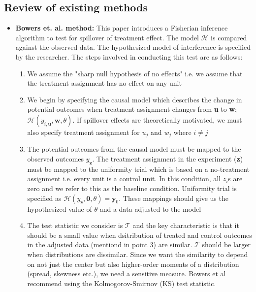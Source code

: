 \documentclass[12pt]{article}
\begin{document}
\subsection{Review of existing methods}
\begin{itemize}
\item {\bf Bowers et. al. method:} This paper introduces a Fisherian inference algorithm to test for spillover of treatment effect. The model $\mathcal{H}$ is compared against the observed data. The hypothesized model of interference is specified by the researcher. The steps involved in conducting this test are as follows:

\begin{enumerate}

\item We assume the "sharp null hypothesis of no effects" i.e. we assume that the treatment assignment has no effect on any unit

\item We begin by specifying the causal model which describes the change in potential outcomes when treatment assignment changes from \textbf{u} to \textbf{w}; $\mathcal{H}(y_{i, \textbf{u}}, \textbf{w}, \theta)$. If spillover effects are theoretically motivated, we must also specify treatment assignment for $u_j$ and $w_j$ where $i \neq j$

\item The potential outcomes from the causal model must be mapped to the observed outcomes $y_\textbf{z}$. The treatment assignment in the experiment (\textbf{z}) must be mapped to the uniformity trial which is based on a no-treatment assignment i.e. every unit is a control unit. In this condition, all $z_{i}$s are zero and we refer to this as the baseline condition. Uniformity trial is specified as $\mathcal{H}(y_{\textbf{z}}, \textbf{0}, \theta) = \textbf{y}_0$. These mappings should give us the hypothesized value of $\theta$ and a data adjusted to the model

\item The test statistic we consider is $\mathcal{T}$ and the key characteristic is that it should be a small value when dsitribution of treated and control outcomes in the adjusted data (mentiond in point 3) are similar. $\mathcal{T}$ should be larger when distributions are dissimilar. Since we want the similarity to depend on not just the center but also higher-order moments of a distribution (spread, skewness etc.), we need a sensitive measure. Bowers et al recommend using the Kolmogorov-Smirnov (KS) test statistic.


\end{enumerate}
\end{itemize}
\end{document}
